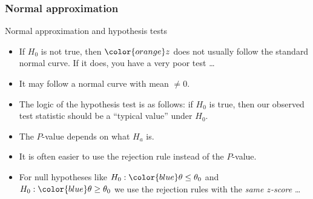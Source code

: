 \documentclass[handout]{beamer}
\begin{document}
   \begin{frame} \frametitle{Normal approximation}

    \begin{block}
     {Normal approximation and hypothesis tests}
     \begin{itemize}
     \item If $H_0$ is not true, then ${\color{orange} z}$ does not usually follow the standard normal curve. If it does, you have a very poor test \dots

     \item It may follow a normal curve with mean $\neq 0$.

     \item The logic of the hypothesis test is as follows: if $H_0$ is true, then
     our observed test statistic should be a ``typical value'' under $H_0$.

     \item The {\color{orange} $P$-value} depends on what $H_a$ is.

     \item It is often easier to use the rejection rule instead
     of the $P$-value.

     \item For null hypotheses like $H_0:{\color{blue} \theta \leq \theta_0}$ and
     $H_0:{\color{blue} \theta \geq \theta_0}$ we use the rejection rules with
     the {\em \color{orange} same  $z$-score} \dots

     \end{itemize}
   \end{block}
   \end{frame}

\end{document}
